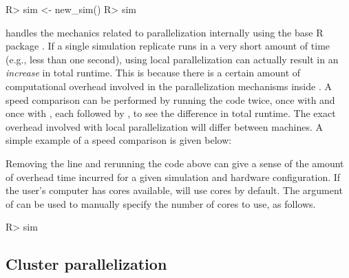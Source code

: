 \begin{example}
R> sim <- new_sim()
R> sim %
\end{example}

 handles the mechanics related to parallelization internally using the base R package  \citep{Rsoftware}. If a single simulation replicate runs in a very short amount of time (e.g., less than one second), using local parallelization can actually result in an \textit{increase} in total runtime. This is because there is a certain amount of computational overhead involved in the parallelization mechanisms inside . A speed comparison can be performed by running the code twice, once with  and once with , each followed by , to see the difference in total runtime. The exact overhead involved with local parallelization will differ between machines. A simple example of a speed comparison is given below:


Removing the line  and rerunning the code above can give a sense of the amount of overhead time incurred for a given simulation and hardware configuration. If the user's computer has  cores available,  will use  cores by default. The  argument of  can be used to manually specify the number of cores to use, as follows.

\begin{example}
R> sim %
\end{example}

\subsection{Cluster parallelization}

